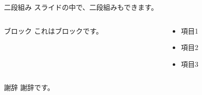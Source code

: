 \documentclass[aspectratio=169]{beamer}
\begin{document}
\begin{frame}[t]{二段組み}
	スライドの中で、二段組みもできます。
	\begin{columns}[t]
		\begin{column}[T]{0.4\textwidth}
			\lipsum[1][1-2]
			\vspace{1em}
			\begin{block}{ブロック}
				これはブロックです。
			\end{block}
		\end{column}
		\begin{column}[T]{0.4\textwidth}
			\begin{itemize}
				\item 項目1
				\item 項目2
				\item 項目3
			\end{itemize}
		\end{column}
	\end{columns}
\end{frame}

\begin{frame}[t]{謝辞}
謝辞です。
\end{frame}
\end{document}
